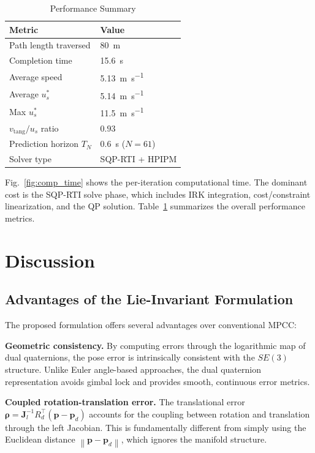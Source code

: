 \documentclass[journal]{IEEEtran}
\newcommand{\SE}{SE(3)}                   %
\newcommand{\norm}[1]{\left\| #1 \right\|}
\begin{document}
\begin{table}[h]
\centering
\caption{Performance Summary}
\label{tab:performance}
\begin{tabular}{ll}
\toprule
\textbf{Metric} & \textbf{Value} \\
\midrule
Path length traversed      & \SI{80}{\meter} \\
Completion time            & \SI{15.6}{\second} \\
Average speed              & \SI{5.13}{\meter\per\second} \\
Average $u_s^*$            & \SI{5.14}{\meter\per\second} \\
Max $u_s^*$                & \SI{11.5}{\meter\per\second} \\
$v_\text{tang}/u_s$ ratio  & $0.93$ \\
Prediction horizon $T_N$   & \SI{0.6}{\second} ($N = 61$) \\
Solver type                & SQP-RTI + HPIPM \\
\bottomrule
\end{tabular}
\end{table}

Fig.~\ref{fig:comp_time} shows the per-iteration computational time. The dominant cost is the SQP-RTI solve phase, which includes IRK integration, cost/constraint linearization, and the QP solution. Table~\ref{tab:performance} summarizes the overall performance metrics.

\section{Discussion}

\subsection{Advantages of the Lie-Invariant Formulation}

The proposed formulation offers several advantages over conventional MPCC:

\textbf{Geometric consistency.} By computing errors through the logarithmic map of dual quaternions, the pose error is intrinsically consistent with the $\SE$ structure. Unlike Euler angle-based approaches, the dual quaternion representation avoids gimbal lock and provides smooth, continuous error metrics.

\textbf{Coupled rotation-translation error.} The translational error $\bm{\rho} = \bm{J}_l^{-1} R_d^\top (\bm{p} - \bm{p}_d)$ accounts for the coupling between rotation and translation through the left Jacobian. This is fundamentally different from simply using the Euclidean distance $\norm{\bm{p} - \bm{p}_d}$, which ignores the manifold structure.
\end{document}
